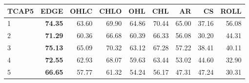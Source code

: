 \begin{table}[ht]
\centering
\begin{tabular}{lrrrrrrrr}
  \hline
TCAP5 & EDGE & OHLC & CHLO & OHL & CHL & AR & CS & ROLL \\ 
  \hline
1 & \textbf{74.35} & 63.60 & 69.90 & 64.86 & 70.44 & 65.00 & 37.16 & 56.08 \\ 
  2 & \textbf{71.29} & 60.36 & 66.68 & 60.39 & 66.33 & 56.08 & 30.20 & 44.31 \\ 
  3 & \textbf{75.13} & 65.09 & 70.32 & 63.12 & 67.28 & 57.22 & 38.41 & 40.11 \\ 
  4 & \textbf{72.55} & 62.93 & 68.07 & 59.63 & 63.44 & 53.02 & 44.60 & 32.90 \\ 
  5 & \textbf{66.65} & 57.77 & 61.32 & 54.24 & 56.17 & 47.31 & 47.24 & 30.31 \\ 
   \hline
\end{tabular}
\end{table}
